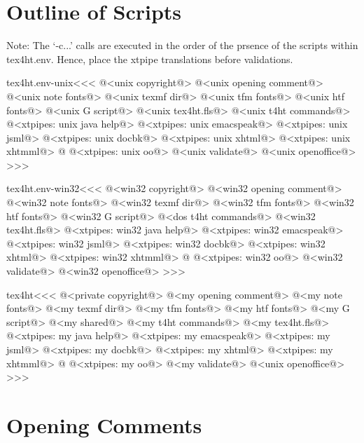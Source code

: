\documentclass{article}
\begin{document}
\section{Outline of Scripts}

Note: The `-c...' calls are executed in the order of the prsence of
the scripts within tex4ht.env.  Hence, place the xtpipe translations
before validations.


\<tex4ht.env-unix\><<<
@<unix copyright@>%
@<unix opening comment@>%
@<unix note fonts@>%
@<unix texmf dir@>%
@<unix tfm fonts@>%
@<unix htf fonts@>%
@<unix G script@>%
@<unix tex4ht.fls@>%
@<unix t4ht commands@>%
@<xtpipes: unix java help@>
@<xtpipes: unix emacspeak@>
@<xtpipes: unix jsml@>
@<xtpipes: unix docbk@>
@<xtpipes: unix xhtml@> 
@<xtpipes: unix xhtmml@> @%
@<xtpipes: unix oo@>%
@<unix validate@> %
@<unix openoffice@>%
>>>


\<tex4ht.env-win32\><<<
@<win32 copyright@>%
@<win32 opening comment@>%
@<win32 note fonts@>%
@<win32 texmf dir@>%
@<win32 tfm fonts@>%
@<win32 htf fonts@>%
@<win32 G script@>%
@<dos t4ht commands@>%
@<win32 tex4ht.fls@>%
@<xtpipes: win32 java help@>
@<xtpipes: win32 emacspeak@>
@<xtpipes: win32 jsml@>
@<xtpipes: win32 docbk@>
@<xtpipes: win32 xhtml@> 
@<xtpipes: win32 xhtmml@> @%
@<xtpipes: win32 oo@>%
@<win32 validate@> %
@<win32 openoffice@>%
>>>



\<tex4ht\><<<
@<private copyright@>%
@<my opening comment@>%
@<my note fonts@>%
@<my texmf dir@>%
@<my tfm fonts@>%
@<my htf fonts@>%
@<my G script@>%
@<my shared@>%
@<my t4ht commands@>%
@<my tex4ht.fls@>%
@<xtpipes: my java help@>
@<xtpipes: my emacspeak@>
@<xtpipes: my jsml@>
@<xtpipes: my docbk@>
@<xtpipes: my xhtml@>
@<xtpipes: my xhtmml@>  @%
@<xtpipes: my oo@>
@<my validate@> %
@<unix openoffice@>%
>>>





\section{Opening Comments}
\end{document}
